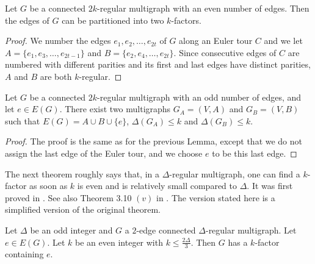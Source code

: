 \begin{lemma}\label{lem:delta_even_kV_even}
Let $G$ be a connected $2k$-regular multigraph with an even number of edges. Then the edges of $G$ can be partitioned into two $k$-factors. 
\end{lemma}

\begin{proof}
We number the edges $e_1, e_2, \dots, e_{2t}$ of $G$ along an Euler tour $C$ and we let $A= \{e_1, e_3, \dots, e_{2t-1}\}$ and $B = \{e_2, e_4, \dots, e_{2t}\}$. 
Since consecutive edges of $C$ are numbered with different parities and its first and last edges  have distinct parities, $A$ and $B$ are both $k$-regular. 
\end{proof}



 

\begin{lemma}\label{lem:delta_even_kV_odd}
Let $G$ be a connected $2k$-regular multigraph with an odd number of edges, and let $e \in E(G)$. There exist two multigraphs $G_{A} = (V,A)$ and $G_{B} = (V,B)$ such that $E(G) = A \cup B \cup \{e\}$, $\Delta(G_{A}) \leq k$ and $\Delta(G_{B}) \leq k$.
\end{lemma}

\begin{proof}
The proof is the same as for the previous Lemma, except that we do not assign the last edge of the Euler tour, and we choose $e$ to be this last edge. 
\end{proof}

The next theorem roughly says that, in a $\Delta$-regular multigraph, one can find a $k$-factor  as soon as $k$ is even and is relatively small compared to $\Delta$. It was first proved in \cite{K84}. See also Theorem 3.10 $(v)$ in \cite{AK11}. The version stated here is a simplified version of the original theorem.    


\begin{theorem}
Let $\Delta$ be an odd integer and $G$ a $2$-edge connected $\Delta$-regular multigraph.  Let $e \in E(G)$. Let $k$ be an even integer with $k \leq \frac{2\Delta}{3}$. Then $G$ has a $k$-factor containing $e$. 
\end{theorem}

